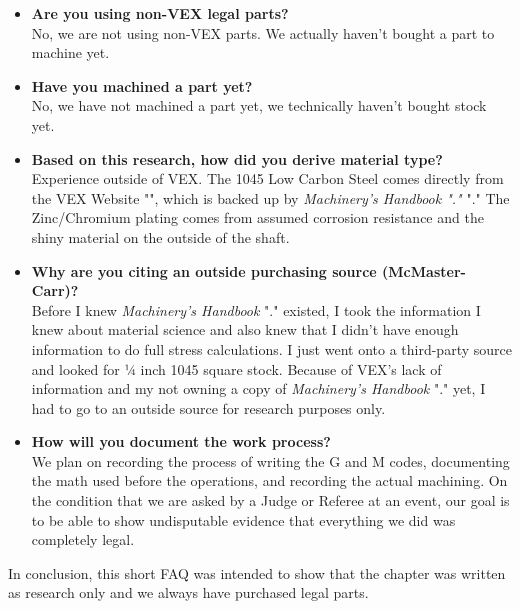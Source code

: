 \begin{itemize}
    \item \textbf{Are you using non-VEX legal parts?} \\
    No, we are not using non-VEX parts. We actually haven’t bought a part to machine yet.
    
    \item \textbf{Have you machined a part yet?} \\
    No, we have not machined a part yet, we technically haven’t bought stock yet.
    
    \item \textbf{Based on this research, how did you derive material type?} \\
    Experience outside of VEX. The 1045 Low Carbon Steel comes directly from the VEX Website "\cite{vexRobotics}", which is backed up by \textit{\textit{Machinery’s Handbook} "\cite{machinists}."} "\cite{machinists}." The Zinc/Chromium plating comes from assumed corrosion resistance and the shiny material on the outside of the shaft.
    
    \item \textbf{Why are you citing an outside purchasing source (McMaster-Carr)?} \\
    Before I knew \textit{Machinery’s Handbook} "\cite{machinists}." existed, I took the information I knew about material science and also knew that I didn’t have enough information to do full stress calculations. I just went onto a third-party source and looked for ¼ inch 1045 square stock. Because of VEX’s lack of information and my not owning a copy of \textit{Machinery’s Handbook} "\cite{machinists}." yet, I had to go to an outside source for research purposes only.
    
    \item \textbf{How will you document the work process?} \\
    We plan on recording the process of writing the G and M codes, documenting the math used before the operations, and recording the actual machining. On the condition that we are asked by a Judge or Referee at an event, our goal is to be able to show undisputable evidence that everything we did was completely legal.
\end{itemize}

In conclusion, this short FAQ was intended to show that the chapter was written as research only and we always have purchased legal parts.
